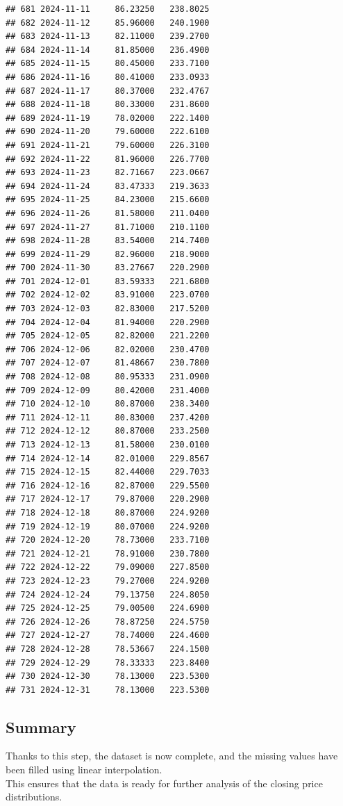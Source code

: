 \documentclass[
]{article}
\begin{document}
\begin{verbatim}
## 681 2024-11-11     86.23250   238.8025
## 682 2024-11-12     85.96000   240.1900
## 683 2024-11-13     82.11000   239.2700
## 684 2024-11-14     81.85000   236.4900
## 685 2024-11-15     80.45000   233.7100
## 686 2024-11-16     80.41000   233.0933
## 687 2024-11-17     80.37000   232.4767
## 688 2024-11-18     80.33000   231.8600
## 689 2024-11-19     78.02000   222.1400
## 690 2024-11-20     79.60000   222.6100
## 691 2024-11-21     79.60000   226.3100
## 692 2024-11-22     81.96000   226.7700
## 693 2024-11-23     82.71667   223.0667
## 694 2024-11-24     83.47333   219.3633
## 695 2024-11-25     84.23000   215.6600
## 696 2024-11-26     81.58000   211.0400
## 697 2024-11-27     81.71000   210.1100
## 698 2024-11-28     83.54000   214.7400
## 699 2024-11-29     82.96000   218.9000
## 700 2024-11-30     83.27667   220.2900
## 701 2024-12-01     83.59333   221.6800
## 702 2024-12-02     83.91000   223.0700
## 703 2024-12-03     82.83000   217.5200
## 704 2024-12-04     81.94000   220.2900
## 705 2024-12-05     82.82000   221.2200
## 706 2024-12-06     82.02000   230.4700
## 707 2024-12-07     81.48667   230.7800
## 708 2024-12-08     80.95333   231.0900
## 709 2024-12-09     80.42000   231.4000
## 710 2024-12-10     80.87000   238.3400
## 711 2024-12-11     80.83000   237.4200
## 712 2024-12-12     80.87000   233.2500
## 713 2024-12-13     81.58000   230.0100
## 714 2024-12-14     82.01000   229.8567
## 715 2024-12-15     82.44000   229.7033
## 716 2024-12-16     82.87000   229.5500
## 717 2024-12-17     79.87000   220.2900
## 718 2024-12-18     80.87000   224.9200
## 719 2024-12-19     80.07000   224.9200
## 720 2024-12-20     78.73000   233.7100
## 721 2024-12-21     78.91000   230.7800
## 722 2024-12-22     79.09000   227.8500
## 723 2024-12-23     79.27000   224.9200
## 724 2024-12-24     79.13750   224.8050
## 725 2024-12-25     79.00500   224.6900
## 726 2024-12-26     78.87250   224.5750
## 727 2024-12-27     78.74000   224.4600
## 728 2024-12-28     78.53667   224.1500
## 729 2024-12-29     78.33333   223.8400
## 730 2024-12-30     78.13000   223.5300
## 731 2024-12-31     78.13000   223.5300
\end{verbatim}

\subsection{Summary}\label{summary}

Thanks to this step, the dataset is now complete, and the missing values
have been filled using linear interpolation.\\
This ensures that the data is ready for further analysis of the closing
price distributions.
\end{document}
